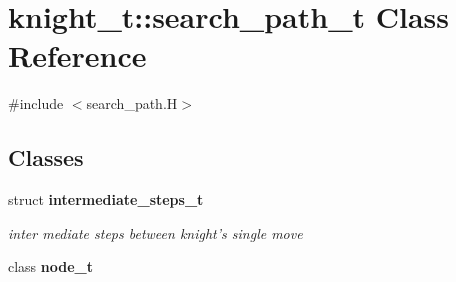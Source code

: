 \hypertarget{classknight__t_1_1search__path__t}{\section{knight\-\_\-t\-:\-:search\-\_\-path\-\_\-t \-Class \-Reference}
\label{classknight__t_1_1search__path__t}
}


{\ttfamily \#include $<$search\-\_\-path.\-H$>$}

\subsection*{\-Classes}
\begin{DoxyCompactItemize}
\item 
struct {\bfseries intermediate\-\_\-steps\-\_\-t}
\begin{DoxyCompactList}\small\item\em inter mediate steps between knight's single move \end{DoxyCompactList}\item 
class {\bfseries node\-\_\-t}
\end{DoxyCompactItemize}
